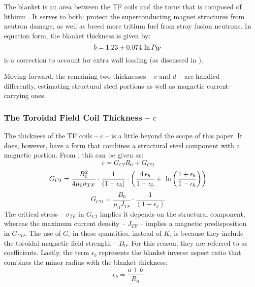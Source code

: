 The blanket is an area between the TF coils and the torus that is  composed  of lithium . It serves to both: protect the superconducting magnet structures from neutron damage, as well as breed  more tritium fuel from stray fusion neutrons.\cite{blanket} In equation form, the blanket thickness is given by: \cite{minervini}
\begin{equation}
	\label{eq:bb}
	b = 1.23 + 0.074 \ \textnormal{ln} \, P_W
\end{equation}
  is a correction to account for extra wall loading (as discussed in ).

Moving forward, the remaining two thicknesses -- $c$ and $d$ -- are handled differently, estimating structural steel portions as well as magnetic current-carrying ones.

\subsubsection{The Toroidal Field Coil Thickness -- $c$}

The thickness of the TF coils -- $c$ -- is a little beyond the scope of this paper. It does, however, have a form that combines a structural steel component with a magnetic portion. From , this can be given as: \cite{minervini}
\begin{equation}
	\label{eq:cc}
	c = G_{CI} R_0 + G_{CO}
\end{equation}
\begin{equation}
	G_{CI} = \frac{B_{0}^2}{ 4 \mu_0 \sigma_{TF} } \cdot \frac{1}{ ( 1 - \epsilon_b )}  \cdot \left( \frac{ 4 \, \epsilon_b}{1+\epsilon_b} + \ \textnormal{ln} \left( \frac{1+\epsilon_b}{1-\epsilon_b} \right) \right)
\end{equation}
\begin{equation}
	G_{CO} = \frac{B_{0}}{ \mu_0 J_{TF} } \cdot \frac{1}{ ( 1 - \epsilon_b )}
\end{equation}
The critical stress -- $\sigma_{TF}$ in $G_{CI}$ implies it depends on the structural component, whereas the maximum current density -- $J_{TF}$ -- implies a magnetic predisposition in $G_{CO}$. The use of $G_\square$ in these quantities, instead of $K_\square$ is because they include the toroidal magnetic field strength -- $B_0$. For this reason, they are referred to as  coefficients. Lastly, the term $\epsilon_b$ represents the blanket inverse aspect ratio that combines the minor radius with the blanket thickness:
\begin{equation}
	\epsilon_b = \frac{ a + b }{R_0}
\end{equation}

